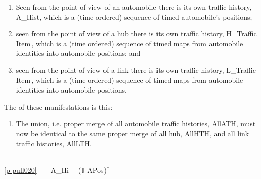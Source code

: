 \label{p-chap2.Intentionality}

\begin{enumerate}\setei
\item \label{p-pull020} Seen from the point of view of an automobile
  there is its own traffic history, \textsf{A\_Hist},
  which is a (time ordered) sequence of timed automobile's positions; 
\item \label{p-pull030} seen from the point of view of a hub
  there is its own traffic history, \textsf{H\_Traffic} Item\,,
  which is a (time ordered) sequence of timed maps from automobile
  identities into automobile positions; and 
\item \label{p-pull040} seen from the point of view of a link
  there is its own traffic history, \textsf{L\_Traffic} Item\,,
  which is a (time ordered) sequence of timed maps from automobile
  identities into automobile positions. 
  \savei\end{enumerate}
\begynd
\pind The  of these manifestations is this:
\afslut
\begin{enumerate}\setei
\item \label{p-pull050} The union, i.e. proper merge of all automobile
  traffic histories, \textsf{AllATH}, must now be identical to the
  same  proper merge of all hub, \textsf{AllHTH}, 
  and all link traffic histories, \textsf{AllLTH}.
\savei\end{enumerate}\sf%
\pos{\psno}{\mnewfoil}
\bp
{}\\
\ref{p-pull020}\ \ \ \ A\_Hi\ \ {\EQ} ($\mathbb{T}$ {\TIMES} APos)$^{\ast}$ \ \ \ \ \ \ \ \\
